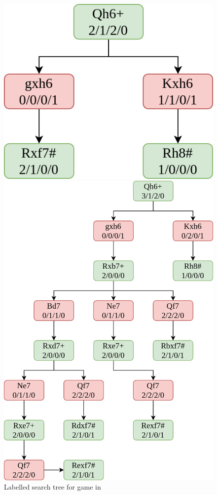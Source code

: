 \begin{figure}[H]
  \begin{minipage}{0.475\textwidth}
    \centering
    \includegraphics[width=\textwidth]{project/img/trees/1.drawio.png}
    \caption{Labelled search tree for game in }
    \label{tree1}
  \end{minipage}
  \hspace{0.05\textwidth}
  \begin{minipage}{0.475\textwidth}
    \centering
    \includegraphics[width=\textwidth]{project/img/trees/2.drawio.png}

\end{minipage}
\end{figure}
